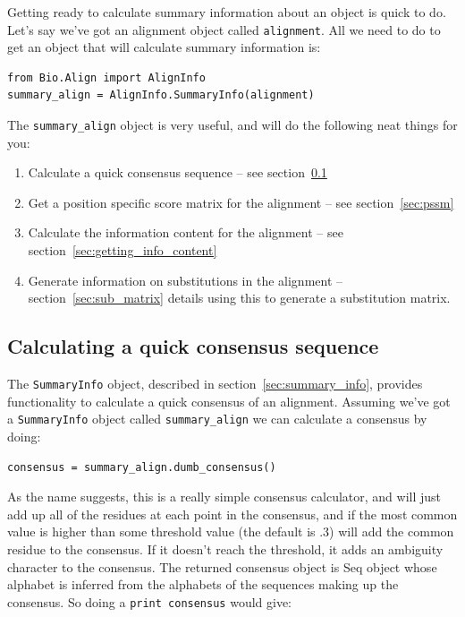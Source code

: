 \documentclass{report}
\begin{document}
Getting ready to calculate summary information about an object is quick to do. Let's say we've got an alignment object called \verb|alignment|. All we need to do to get an object that will calculate summary information is:

\begin{verbatim}
from Bio.Align import AlignInfo
summary_align = AlignInfo.SummaryInfo(alignment)
\end{verbatim}

The \verb|summary_align| object is very useful, and will do the following neat things for you:

\begin{enumerate}
  \item Calculate a quick consensus sequence -- see section~\ref{sec:consensus}
  \item Get a position specific score matrix for the alignment -- see section~\ref{sec:pssm}
  \item Calculate the information content for the alignment -- see section~\ref{sec:getting_info_content}
  \item Generate information on substitutions in the alignment -- section~\ref{sec:sub_matrix} details using this to generate a substitution matrix.
\end{enumerate}

\subsection{Calculating a quick consensus sequence}
\label{sec:consensus}

The \verb|SummaryInfo| object, described in section~\ref{sec:summary_info}, provides functionality to calculate a quick consensus of an alignment. Assuming we've got a \verb|SummaryInfo| object called \verb|summary_align| we can calculate a consensus by doing:

\begin{verbatim}
consensus = summary_align.dumb_consensus()
\end{verbatim}

As the name suggests, this is a really simple consensus calculator, and will just add up all of the residues at each point in the consensus, and if the most common value is higher than some threshold value (the default is .3) will add the common residue to the consensus. If it doesn't reach the threshold, it adds an ambiguity character to the consensus. The returned consensus object is Seq object whose alphabet is inferred from the alphabets of the sequences making up the consensus. So doing a \verb|print consensus| would give:
\end{document}
